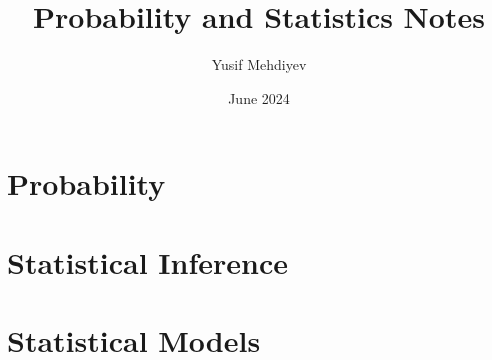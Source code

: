 \documentclass[11pt]{scrreprt}
\begin{document}
\renewcommand{\figurename}{Image}

\title{Probability and Statistics Notes}
\author{Yusif Mehdiyev}
\date{June 2024}
\maketitle

\tableofcontents

\part{Probability}





\part{Statistical Inference}





\part{Statistical Models}





\end{document}
